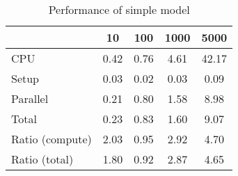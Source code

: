\begin{table}[!h]
\centering
\caption{Performance of simple model}
\begin{tabular}{l*{4}{c}}\hline
& 10 &             100 &            1000 &            5000 \\ \hline
CPU &     0.42 &      0.76 &      4.61 &     42.17 \\
Setup &     0.03 &      0.02 &      0.03 &      0.09 \\
Parallel &     0.21 &      0.80 &      1.58 &      8.98 \\
Total &     0.23 &      0.83 &      1.60 &      9.07 \\
Ratio (compute) &     2.03 &      0.95 &      2.92 &      4.70 \\
Ratio (total) &     1.80 &      0.92 &      2.87 &      4.65 \\
\hline
\end{tabular}
\end{table}
